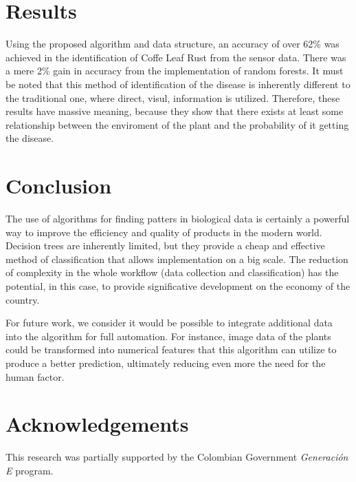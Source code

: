 \documentclass{acm_proc_article-sp}
\begin{document}
\section{Results}
Using the proposed algorithm and data structure, an accuracy of over 62\% was achieved in the identification of Coffe Leaf Rust from the sensor data. There was a mere 2\% gain in accuracy from the implementation of random forests. It must be noted that this method of identification of the disease is inherently different to the traditional one, where direct, visul, information is utilized. Therefore, these results have massive meaning, because they show that there exists at least some relationship between the enviroment of the plant and the probability of it getting the disease.

\section{Conclusion}
The use of algorithms for finding patters in biological data is certainly a powerful way to improve the efficiency and quality of products in the modern world. Decision trees are inherently limited, but they provide a cheap and effective method of classification that allows implementation on a big scale. The reduction of complexity in the whole workflow (data collection and classification) has the potential, in this case, to provide significative development on the economy of the country. \par

For future work, we consider it would be possible to integrate additional data into the algorithm for full automation. For instance, image data of the plants could be transformed into numerical features that this algorithm can utilize to produce a better prediction, ultimately reducing even more the need for the human factor.

\section{Acknowledgements}
This research was partially supported by the Colombian Government \textit{Generación E} program.
\end{document}
